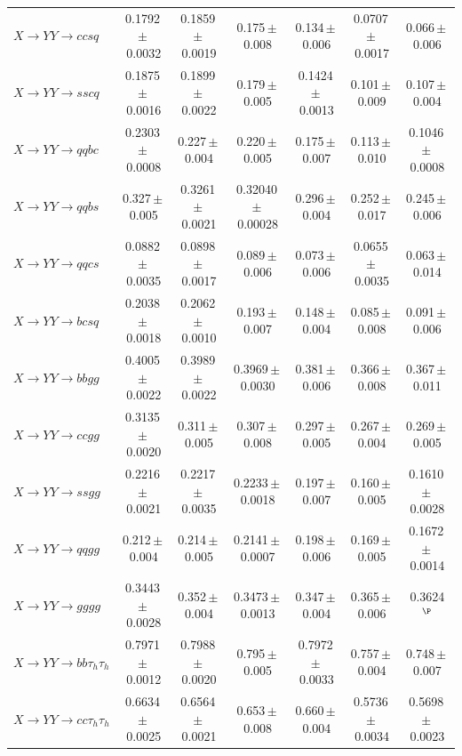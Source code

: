 \begin{landscape}
{\begin{longtable}{@{\extracolsep{\fill}}lcccccc@{}}
$X\to YY\to ccsq$ & 0.1792\,$\pm$\,0.0032 & 0.1859\,$\pm$\,0.0019 & 0.175\,$\pm$\,0.008 & 0.134\,$\pm$\,0.006 & 0.0707\,$\pm$\,0.0017 & 0.066\,$\pm$\,0.006 \\
$X\to YY\to sscq$ & 0.1875\,$\pm$\,0.0016 & 0.1899\,$\pm$\,0.0022 & 0.179\,$\pm$\,0.005 & 0.1424\,$\pm$\,0.0013 & 0.101\,$\pm$\,0.009 & 0.107\,$\pm$\,0.004 \\
$X\to YY\to qqbc$ & 0.2303\,$\pm$\,0.0008 & 0.227\,$\pm$\,0.004 & 0.220\,$\pm$\,0.005 & 0.175\,$\pm$\,0.007 & 0.113\,$\pm$\,0.010 & 0.1046\,$\pm$\,0.0008 \\
$X\to YY\to qqbs$ & 0.327\,$\pm$\,0.005 & 0.3261\,$\pm$\,0.0021 & 0.32040\,$\pm$\,0.00028 & 0.296\,$\pm$\,0.004 & 0.252\,$\pm$\,0.017 & 0.245\,$\pm$\,0.006 \\
$X\to YY\to qqcs$ & 0.0882\,$\pm$\,0.0035 & 0.0898\,$\pm$\,0.0017 & 0.089\,$\pm$\,0.006 & 0.073\,$\pm$\,0.006 & 0.0655\,$\pm$\,0.0035 & 0.063\,$\pm$\,0.014 \\
$X\to YY\to bcsq$ & 0.2038\,$\pm$\,0.0018 & 0.2062\,$\pm$\,0.0010 & 0.193\,$\pm$\,0.007 & 0.148\,$\pm$\,0.004 & 0.085\,$\pm$\,0.008 & 0.091\,$\pm$\,0.006 \\
$X\to YY\to bbgg$ & 0.4005\,$\pm$\,0.0022 & 0.3989\,$\pm$\,0.0022 & 0.3969\,$\pm$\,0.0030 & 0.381\,$\pm$\,0.006 & 0.366\,$\pm$\,0.008 & 0.367\,$\pm$\,0.011 \\
$X\to YY\to ccgg$ & 0.3135\,$\pm$\,0.0020 & 0.311\,$\pm$\,0.005 & 0.307\,$\pm$\,0.008 & 0.297\,$\pm$\,0.005 & 0.267\,$\pm$\,0.004 & 0.269\,$\pm$\,0.005 \\
$X\to YY\to ssgg$ & 0.2216\,$\pm$\,0.0021 & 0.2217\,$\pm$\,0.0035 & 0.2233\,$\pm$\,0.0018 & 0.197\,$\pm$\,0.007 & 0.160\,$\pm$\,0.005 & 0.1610\,$\pm$\,0.0028 \\
$X\to YY\to qqgg$ & 0.212\,$\pm$\,0.004 & 0.214\,$\pm$\,0.005 & 0.2141\,$\pm$\,0.0007 & 0.198\,$\pm$\,0.006 & 0.169\,$\pm$\,0.005 & 0.1672\,$\pm$\,0.0014 \\
$X\to YY\to gggg$ & 0.3443\,$\pm$\,0.0028 & 0.352\,$\pm$\,0.004 & 0.3473\,$\pm$\,0.0013 & 0.347\,$\pm$\,0.004 & 0.365\,$\pm$\,0.006 & 0.3624$^{\P}$ \\
\midrule
$X\to YY\to bb\tau_h\tau_h$ & 0.7971\,$\pm$\,0.0012 & 0.7988\,$\pm$\,0.0020 & 0.795\,$\pm$\,0.005 & 0.7972\,$\pm$\,0.0033 & 0.757\,$\pm$\,0.004 & 0.748\,$\pm$\,0.007 \\
$X\to YY\to cc\tau_h\tau_h$ & 0.6634\,$\pm$\,0.0025 & 0.6564\,$\pm$\,0.0021 & 0.653\,$\pm$\,0.008 & 0.660\,$\pm$\,0.004 & 0.5736\,$\pm$\,0.0034 & 0.5698\,$\pm$\,0.0023 \\

\end{longtable}}
\end{landscape}
